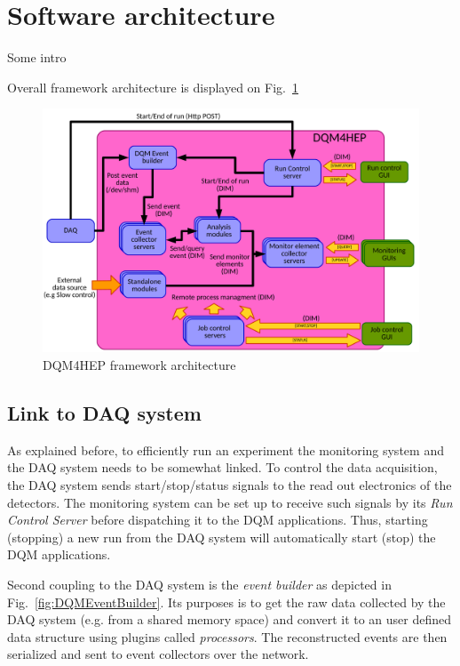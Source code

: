 \documentclass[conference]{IEEEtran}
\begin{document}
\section{Software architecture}
{\color{red}Some intro}

Overall framework architecture is displayed on Fig.~\ref{fig:DQM4HEPArchitecture}
\begin{figure}[htbp]
  \begin{center}
    \includegraphics[width=0.95\linewidth]{figs/GlobalArchitectureDiagram.pdf}
    \caption{\label{fig:DQM4HEPArchitecture} DQM4HEP framework architecture}
  \end{center}
\end{figure}


\subsection{Link to DAQ system}
As explained before, to efficiently run an experiment the monitoring system and the DAQ system needs to be somewhat linked. To control the data acquisition, the DAQ system sends start/stop/status signals to the read out electronics of the detectors. The monitoring system can be set up to receive such signals by
its \textit{Run Control Server} before dispatching it to the DQM applications. Thus, starting (stopping) a new run from the DAQ system will automatically start (stop) the DQM applications.

Second coupling to the DAQ system is the \textit{event builder} as depicted in Fig.~\ref{fig:DQMEventBuilder}. Its purposes is to get the raw data collected by the DAQ system (e.g. from a shared memory space) and convert it to an user defined data structure using plugins called \textit{processors}. The reconstructed events are then serialized and sent to event collectors over the network.
\end{document}
